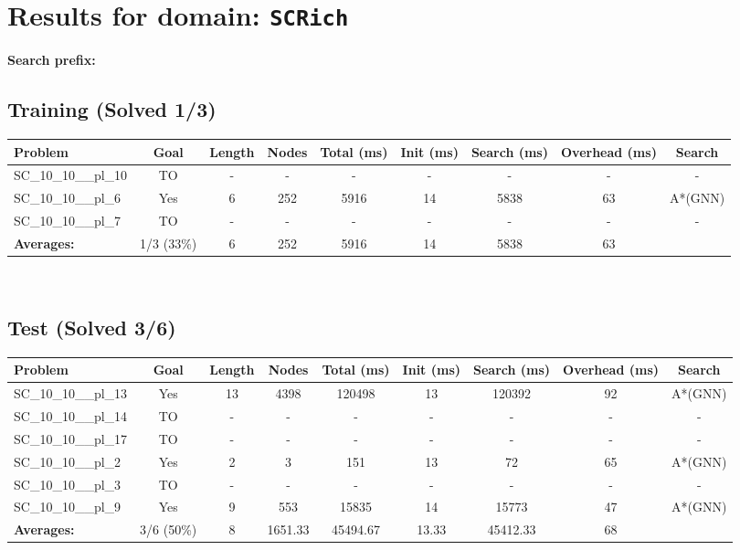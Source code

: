 \documentclass{article}
\begin{document}
\section*{Results for domain: \texttt{SCRich}}
\textbf{Search prefix:} 
\\[0.5cm]
\subsection*{Training (Solved 1/3)}
\begin{tabular}{lcccccccc}
\toprule
Problem & Goal & Length & Nodes & Total (ms) & Init (ms) & Search (ms) & Overhead (ms) & Search \\
\midrule
SC\_10\_10\_\_pl\_10 & TO & - & - & - & - & - & - & - \\
SC\_10\_10\_\_pl\_6 & Yes & 6 & 252 & 5916 & 14 & 5838 & 63 & A*(GNN) \\
SC\_10\_10\_\_pl\_7 & TO & - & - & - & - & - & - & - \\
\textbf{Averages:} & 1/3 (33\%) & 6 & 252 & 5916 & 14 & 5838 & 63 & \\
\bottomrule
\end{tabular}
\\[0.7cm]
\subsection*{Test (Solved 3/6)}
\begin{tabular}{lcccccccc}
\toprule
Problem & Goal & Length & Nodes & Total (ms) & Init (ms) & Search (ms) & Overhead (ms) & Search \\
\midrule
SC\_10\_10\_\_pl\_13 & Yes & 13 & 4398 & 120498 & 13 & 120392 & 92 & A*(GNN) \\
SC\_10\_10\_\_pl\_14 & TO & - & - & - & - & - & - & - \\
SC\_10\_10\_\_pl\_17 & TO & - & - & - & - & - & - & - \\
SC\_10\_10\_\_pl\_2 & Yes & 2 & 3 & 151 & 13 & 72 & 65 & A*(GNN) \\
SC\_10\_10\_\_pl\_3 & TO & - & - & - & - & - & - & - \\
SC\_10\_10\_\_pl\_9 & Yes & 9 & 553 & 15835 & 14 & 15773 & 47 & A*(GNN) \\
\textbf{Averages:} & 3/6 (50\%) & 8 & 1651.33 & 45494.67 & 13.33 & 45412.33 & 68 & \\
\bottomrule
\end{tabular}
\\[0.7cm]
\end{document}
